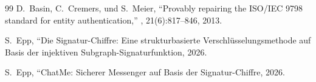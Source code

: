 ﻿\documentclass[12pt, a4paper]{article}
\theoremstyle{plain}
\theoremstyle{definition}
\theoremstyle{remark}
\begin{document}
\begin{thebibliography}{99}
D.~Basin, C.~Cremers, und S.~Meier,
\newblock ``Provably repairing the ISO/IEC 9798 standard for entity authentication,''
, 21(6):817--846, 2013.

S.~Epp,
\newblock ``Die Signatur-Chiffre: Eine strukturbasierte Verschlüsselungsmethode auf Basis der injektiven Subgraph-Signaturfunktion, 2026.

S.~Epp,
\newblock ``ChatMe: Sicherer Messenger auf Basis der Signatur-Chiffre, 2026.

\end{thebibliography}
\end{document}
